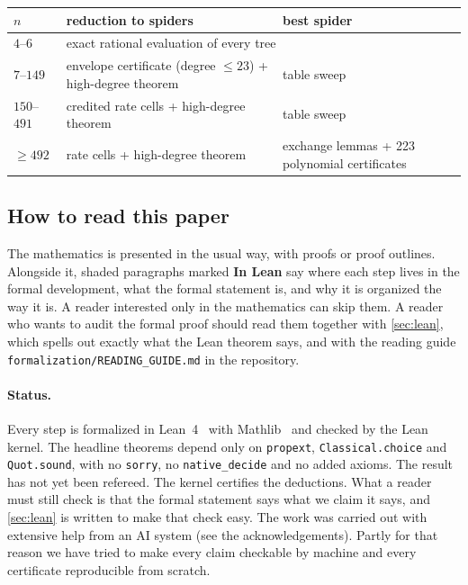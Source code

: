 \documentclass[11pt]{article}
\theoremstyle{definition}
\newcommand{\lean}[1]{\texttt{#1}}
\begin{document}
\begin{center}\small
\begin{tabular}{@{}lp{}p{}@{}}
\toprule
$n$ & reduction to spiders & best spider \\
\midrule
$4$--$6$ & \multicolumn{2}{p{0.78\textwidth}}{exact rational evaluation of every tree} \\
$7$--$149$ & envelope certificate (degree $\le 23$) + high-degree theorem & table sweep \\
$150$--$491$ & credited rate cells + high-degree theorem & table sweep \\
$\ge 492$ & rate cells + high-degree theorem & exchange lemmas + 223 polynomial certificates \\
\bottomrule
\end{tabular}
\end{center}

\subsection{How to read this paper}

The mathematics is presented in the usual way, with proofs or proof outlines. Alongside it, shaded
paragraphs marked \textbf{In Lean} say where each step lives in the formal development, what the formal
statement is, and why it is organized the way it is. A reader interested only in the mathematics can
skip them. A reader who wants to audit the formal proof should read them together with
\cref{sec:lean}, which spells out exactly what the Lean theorem says, and with the reading guide
\texttt{formalization/READING\_GUIDE.md} in the repository.

\paragraph{Status.} Every step is formalized in Lean~4~\cite{Lean4} with Mathlib~\cite{Mathlib} and checked by the
Lean kernel. The headline theorems depend only on \lean{propext}, \lean{Classical.choice} and
\lean{Quot.sound}, with no \lean{sorry}, no \lean{native\_decide} and no added axioms. The result has not
yet been refereed. The kernel certifies the deductions. What a reader must still check is that the formal
statement says what we claim it says, and \cref{sec:lean} is written to make that check easy. The work
was carried out with extensive help from an AI system (see the acknowledgements). Partly for that reason
we have tried to make every claim checkable by machine and every certificate reproducible from scratch.
\end{document}
